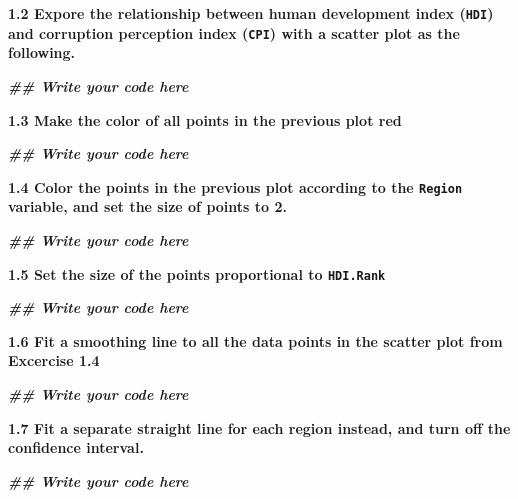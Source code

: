 \documentclass[
]{article}
\newenvironment{Shaded}{\begin{snugshade}}{\end{snugshade}}
\newcommand{\DocumentationTok}[1]{\textcolor[rgb]{0.56,0.35,0.01}{\textbf{\textit{#1}}}}
\begin{document}
\textbf{1.2 Expore the relationship between human development index
(\texttt{HDI}) and corruption perception index (\texttt{CPI}) with a
scatter plot as the following.}

\begin{Shaded}
\begin{Highlighting}[]
\DocumentationTok{\#\# Write your code here}
\end{Highlighting}
\end{Shaded}

\textbf{1.3 Make the color of all points in the previous plot red}

\begin{Shaded}
\begin{Highlighting}[]
\DocumentationTok{\#\# Write your code here}
\end{Highlighting}
\end{Shaded}

\textbf{1.4 Color the points in the previous plot according to the
\texttt{Region} variable, and set the size of points to 2.}

\begin{Shaded}
\begin{Highlighting}[]
\DocumentationTok{\#\# Write your code here}
\end{Highlighting}
\end{Shaded}

\textbf{1.5 Set the size of the points proportional to
\texttt{HDI.Rank}}

\begin{Shaded}
\begin{Highlighting}[]
\DocumentationTok{\#\# Write your code here}
\end{Highlighting}
\end{Shaded}

\textbf{1.6 Fit a smoothing line to all the data points in the scatter
plot from Excercise 1.4}

\begin{Shaded}
\begin{Highlighting}[]
\DocumentationTok{\#\# Write your code here}
\end{Highlighting}
\end{Shaded}

\textbf{1.7 Fit a separate straight line for each region instead, and
turn off the confidence interval.}

\begin{Shaded}
\begin{Highlighting}[]
\DocumentationTok{\#\# Write your code here}
\end{Highlighting}
\end{Shaded}
\end{document}
